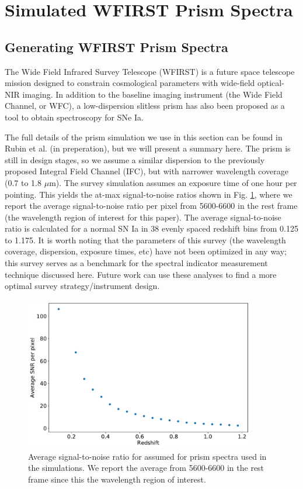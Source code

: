 \section{Simulated WFIRST Prism Spectra}
\label{wfirst}
\subsection{Generating WFIRST Prism Spectra}
The Wide Field Infrared Survey Telescope (WFIRST) is a future space telescope mission designed to constrain cosmological parameters with wide-field optical-NIR imaging. In addition to the baseline imaging instrument (the Wide Field Channel, or WFC), a low-dispersion slitless prism has also been proposed as a tool to obtain spectroscopy for SNe Ia.

The full details of the prism simulation we use in this section can be found in Rubin et al. (in preperation), but we will present a summary here. The prism is still in design stages, so we assume a similar dispersion to the previously proposed Integral Field Channel (IFC), but with narrower wavelength coverage (0.7 to 1.8 $\mu$m). The survey simulation assumes an exposure time of one hour per pointing. This yields the at-max signal-to-noise ratios shown in Fig. \ref{snr_wfirst_prism}, where we report the average signal-to-noise ratio per pixel from 5600-6600 \angstrom\; in the rest frame (the wavelength region of interest for this paper). The average signal-to-noise ratio is calculated for a normal SN Ia in 38 evenly spaced redshift bins from 0.125 to 1.175. It is worth noting that the parameters of this survey (the wavelength coverage, dispersion, exposure times, etc) have not been optimized in any way; this survey serves as a benchmark for the spectral indicator measurement technique discussed here. Future work can use these analyses to find a more optimal survey strategy/instrument design.

\begin{figure}[!htb]
    \centering
    \includegraphics[width=0.9\textwidth]{figures/si_feat_pca/wfirst_snr_vs_redshift.pdf}
    \caption{Average signal-to-noise ratio for assumed for prism spectra used in the simulations. We report the average from 5600-6600 \angstrom\; in the rest frame since this the wavelength region of interest.}
    \label{snr_wfirst_prism}
\end{figure}

